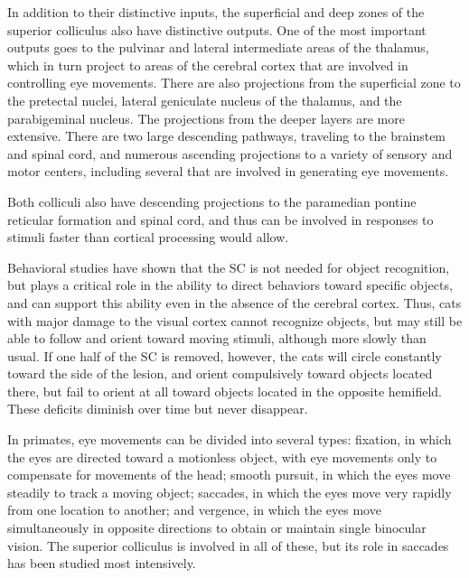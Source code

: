 In addition to their distinctive inputs, the superficial and deep zones of the superior colliculus also have distinctive outputs. One of the most important outputs goes to the pulvinar and lateral intermediate areas of the thalamus, which in turn project to areas of the cerebral cortex that are involved in controlling eye movements. There are also projections from the superficial zone to the pretectal nuclei, lateral geniculate nucleus of the thalamus, and the parabigeminal nucleus. The projections from the deeper layers are more extensive. There are two large descending pathways, traveling to the brainstem and spinal cord, and numerous ascending projections to a variety of sensory and motor centers, including several that are involved in generating eye movements.

Both colliculi also have descending projections to the paramedian pontine reticular formation and spinal cord, and thus can be involved in responses to stimuli faster than cortical processing would allow.

Behavioral studies have shown that the SC is not needed for object recognition, but plays a critical role in the ability to direct behaviors toward specific objects, and can support this ability even in the absence of the cerebral cortex. Thus, cats with major damage to the visual cortex cannot recognize objects, but may still be able to follow and orient toward moving stimuli, although more slowly than usual. If one half of the SC is removed, however, the cats will circle constantly toward the side of the lesion, and orient compulsively toward objects located there, but fail to orient at all toward objects located in the opposite hemifield. These deficits diminish over time but never disappear.

In primates, eye movements can be divided into several types: fixation, in which the eyes are directed toward a motionless object, with eye movements only to compensate for movements of the head; smooth pursuit, in which the eyes move steadily to track a moving object; saccades, in which the eyes move very rapidly from one location to another; and vergence, in which the eyes move simultaneously in opposite directions to obtain or maintain single binocular vision. The superior colliculus is involved in all of these, but its role in saccades has been studied most intensively.

